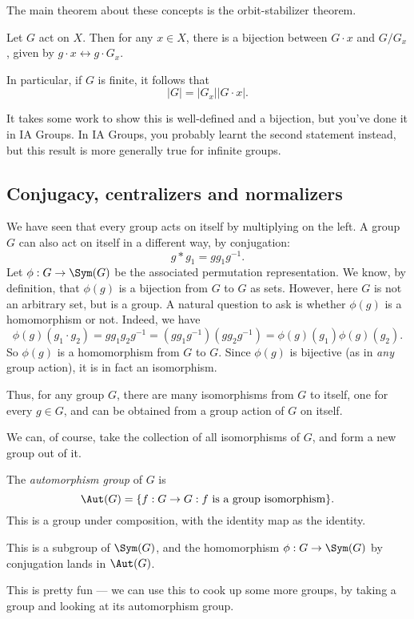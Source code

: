 \documentclass[a4paper]{article}
\begin{document}
The main theorem about these concepts is the orbit-stabilizer theorem.
\begin{thm}
  Let $G$ act on $X$. Then for any $x \in X$, there is a bijection between $G\cdot x$ and $G/G_x$, given by $g \cdot x \leftrightarrow g\cdot G_x$.

  In particular, if $G$ is finite, it follows that
  \[
    |G| = |G_x| |G \cdot x|.
  \]
\end{thm}
It takes some work to show this is well-defined and a bijection, but you've done it in IA Groups. In IA Groups, you probably learnt the second statement instead, but this result is more generally true for infinite groups.

\subsection{Conjugacy, centralizers and normalizers}
We have seen that every group acts on itself by multiplying on the left. A group $G$ can also act on itself in a different way, by conjugation:
\[
  g * g_1 = g g_1 g^{-1}.
\]
Let $\phi: G \to \Sym(G)$ be the associated permutation representation. We know, by definition, that $\phi(g)$ is a bijection from $G$ to $G$ as sets. However, here $G$ is not an arbitrary set, but is a group. A natural question to ask is whether $\phi(g)$ is a homomorphism or not. Indeed, we have
\[
  \phi(g) (g_1 \cdot g_2) = g g_1 g_2 g^{-1} = (g g_1 g^{-1})(g g_2 g^{-1}) = \phi(g)(g_1) \phi(g) (g_2).
\]
So $\phi(g)$ is a homomorphism from $G$ to $G$. Since $\phi(g)$ is bijective (as in \emph{any} group action), it is in fact an isomorphism.

Thus, for any group $G$, there are many isomorphisms from $G$ to itself, one for every $g \in G$, and can be obtained from a group action of $G$ on itself.

We can, of course, take the collection of all isomorphisms of $G$, and form a new group out of it.
\begin{defi}
  The \emph{automorphism group} of $G$ is
  \[
    \Aut(G) = \{f: G \to G: f\text{ is a group isomorphism}\}.
  \]
  This is a group under composition, with the identity map as the identity.
\end{defi}
This is a subgroup of $\Sym(G)$, and the homomorphism $\phi: G\to \Sym(G)$ by conjugation lands in $\Aut(G)$.

This is pretty fun --- we can use this to cook up some more groups, by taking a group and looking at its automorphism group.
\end{document}
